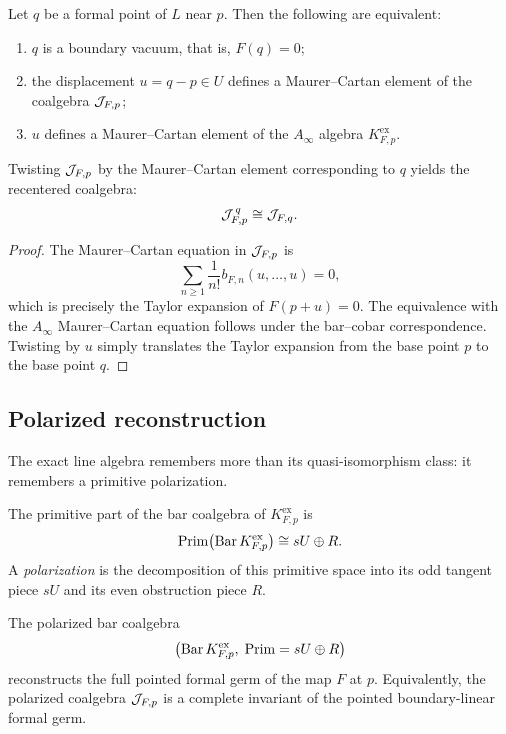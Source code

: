 \begin{theorem}\label{thm:mc-vacua}
Let $q$ be a formal point of $L$ near $p$. Then the following are equivalent:
\begin{enumerate}[label=(\roman*),leftmargin=1.8em]
\item $q$ is a boundary vacuum, that is, $F(q)=0$;
\item the displacement $u=q-p\in U$ defines a Maurer--Cartan element of the coalgebra $\mathcal J_{F,p}$;
\item $u$ defines a Maurer--Cartan element of the $A_\infty$ algebra $K^{\mathrm{ex}}_{F,p}$.
\end{enumerate}
Twisting $\mathcal J_{F,p}$ by the Maurer--Cartan element corresponding to $q$ yields the recentered coalgebra:
\[
\mathcal J_{F,p}^{\,q}\cong \mathcal J_{F,q}.
\]
\end{theorem}

\begin{proof}
The Maurer--Cartan equation in $\mathcal J_{F,p}$ is
\[
\sum_{n\ge 1}\frac{1}{n!} b_{F,n}(u,\dots,u)=0,
\]
which is precisely the Taylor expansion of $F(p+u)=0$. The equivalence with the $A_\infty$ Maurer--Cartan equation follows under the bar--cobar correspondence. Twisting by $u$ simply translates the Taylor expansion from the base point $p$ to the base point $q$.
\end{proof}

\subsection{Polarized reconstruction}

The exact line algebra remembers more than its quasi-isomorphism class: it remembers a primitive polarization.

\begin{definition}
The primitive part of the bar coalgebra of $K^{\mathrm{ex}}_{F,p}$ is
\[
\mathrm{Prim}\bigl(\operatorname{Bar} K^{\mathrm{ex}}_{F,p}\bigr)\cong sU\oplus R.
\]
A \emph{polarization} is the decomposition of this primitive space into its odd tangent piece $sU$ and its even obstruction piece $R$.
\end{definition}

\begin{theorem}\label{thm:polarized-reconstruction}
The polarized bar coalgebra
\[
\bigl(\operatorname{Bar} K^{\mathrm{ex}}_{F,p},\; \mathrm{Prim}=sU\oplus R\bigr)
\]
reconstructs the full pointed formal germ of the map $F$ at $p$. Equivalently, the polarized coalgebra $\mathcal J_{F,p}$ is a complete invariant of the pointed boundary-linear formal germ.
\end{theorem}

